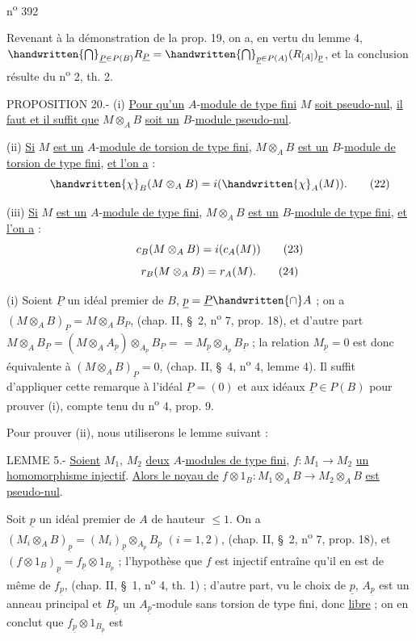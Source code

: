 n\textsuperscript{o} 392

Revenant à la démonstration de la prop. 19, on a, en vertu du lemme 4, $\handwritten{\bigcap}_{\underline P\in P(B)}R_{\underline P}=\handwritten{\bigcap}_{\underline p\in P(A)}(R_{[A]})_{\underline p}$, et la conclusion résulte du n\textsuperscript{o} 2, th. 2.

PROPOSITION 20.- (i) \uline{Pour qu'un} $A$-\uline{module de type fini} $M$ \uline{soit pseudo-nul}, \uline{il faut et il suffit que} $M\otimes_A B$ \uline{soit un} $B$-\uline{module pseudo-nul}.

(ii) \uline{Si} $M$ \uline{est un} $A$-\uline{module de torsion de type fini}, $M\otimes_A B$ \uline{est un} $B$-\uline{module de torsion de type fini}, \uline{et l'on a} :
\[
\handwritten{\chi}_B(M\otimes_A B)=i(\handwritten{\chi}_A(M)).\tag*{\makebox[0pt][r]{\makebox[\displaywidth][l]{(22)}}}
\]

(iii) \uline{Si} $M$ \uline{est un} $A$-\uline{module de type fini}, $M\otimes_A B$ \uline{est un} $B$-\uline{module de type fini}, \uline{et l'on a} :
\[
c_B(M\otimes_A B)=i(c_A(M))\tag*{\makebox[0pt][r]{\makebox[\displaywidth][l]{(23)}}}
\]
\[
r_B(M\otimes_A B)=r_A(M).\tag*{\makebox[0pt][r]{\makebox[\displaywidth][l]{(24)}}}
\]

(i) Soient $\underline P$ un idéal premier de $B$, $\underline p=\underline P\handwritten{\cap} A$ ; on a $(M\otimes_A B)_{\underline P}=M\otimes_A B_{\underline P}$, (chap. II, \S~2, n\textsuperscript{o} 7, prop. 18), et d'autre part $M\otimes_A B_{\underline P}=(M\otimes_A A_{\underline p})\otimes_{A_{\underline p}}B_{\underline P}={}=M_{\underline p}\otimes_{A_{\underline p}}B_{\underline P}$ ; la relation $M_{\underline p}=0$ est donc équivalente à $(M\otimes_A B)_{\underline P}=0$, (chap. II, \S~4, n\textsuperscript{o} 4, lemme 4). Il suffit d'appliquer cette remarque à l'idéal $\underline P=(0)$ et aux idéaux $\underline P\in P(B)$ pour prouver (i), compte tenu du n\textsuperscript{o} 4, prop. 9.

Pour prouver (ii), nous utiliserons le lemme suivant :

LEMME 5.- \uline{Soient} $M_1$, $M_2$ \uline{deux} $A$-\uline{modules de type fini}, $f:M_1\longrightarrow M_2$ \uline{un homomorphisme injectif}. \uline{Alors le noyau de} $f\otimes 1_B:M_1\otimes_A B\longrightarrow M_2\otimes_A B$ \uline{est pseudo-nul}.

Soit $\underline p$ un idéal premier de $A$ de hauteur $\leq 1$. On a $(M_i\otimes_A B)_{\underline p}=(M_i)_{\underline p}\otimes_{A_{\underline p}}B_{\underline p}$ $(i=1,2)$, (chap. II, \S~2, n\textsuperscript{o} 7, prop. 18), et $(f\otimes 1_B)_{\underline p}=f_{\underline p}\otimes 1_{B_{\underline p}}$ ; l'hypothèse que $f$ est injectif entraîne qu'il en est de même de $f_{\underline p}$, (chap. II, \S~1, n\textsuperscript{o} 4, th. 1) ; d'autre part, vu le choix de $\underline p$, $A_{\underline p}$ est un anneau principal et $B_{\underline p}$ un $A_{\underline p}$-module sans torsion de type fini, donc \uline{libre} ; on en conclut que $f_{\underline p}\otimes 1_{B_{\underline p}}$ est
